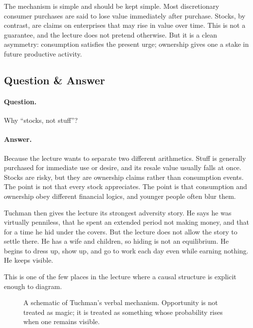The mechanism is simple and should be kept simple. Most discretionary consumer purchases are said to lose value immediately after purchase. Stocks, by contrast, are claims on enterprises that may rise in value over time. This is not a guarantee, and the lecture does not pretend otherwise. But it is a clean asymmetry: consumption satisfies the present urge; ownership gives one a stake in future productive activity.

\subsection{Question \& Answer}

\paragraph{Question.} Why ``stocks, not stuff''?

\paragraph{Answer.} Because the lecture wants to separate two different arithmetics. Stuff is generally purchased for immediate use or desire, and its resale value usually falls at once. Stocks are risky, but they are ownership claims rather than consumption events. The point is not that every stock appreciates. The point is that consumption and ownership obey different financial logics, and younger people often blur them.

Tuchman then gives the lecture its strongest adversity story. He says he was virtually penniless, that he spent an extended period not making money, and that for a time he hid under the covers. But the lecture does not allow the story to settle there. He has a wife and children, so hiding is not an equilibrium. He begins to dress up, show up, and go to work each day even while earning nothing. He keeps visible.

This is one of the few places in the lecture where a causal structure is explicit enough to diagram.

\begin{figure}[h]
\centering
{}
\caption{A schematic of Tuchman's verbal mechanism. Opportunity is not treated as magic; it is treated as something whose probability rises when one remains visible.}
\end{figure}

